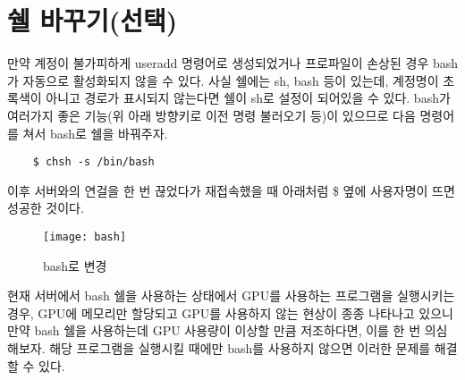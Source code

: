 \section{쉘 바꾸기(선택)}
만약 계정이 불가피하게 useradd 명령어로 생성되었거나 프로파일이 손상된 경우 bash가 자동으로 활성화되지 않을 수 있다. 사실 쉘에는 sh, bash 등이 있는데, 계정명이 초록색이 아니고 경로가 표시되지 않는다면 쉘이 sh로 설정이 되어있을 수 있다. bash가 여러가지 좋은 기능(위 아래 방향키로 이전 명령 불러오기 등)이 있으므로 다음 명령어를 쳐서 bash로 쉘을 바꿔주자.
\begin{lstlisting}
    $ chsh -s /bin/bash
\end{lstlisting}
이후 서버와의 연걸을 한 번 끊었다가 재접속했을 때 아래처럼 \$ 옆에 사용자명이 뜨면 성공한 것이다.
\begin{figure}[H]
	\begin{center}
        \texttt{[image: bash]}
        \caption{bash로 변경}
    \end{center}
\end{figure}
현재 서버에서 bash 쉘을 사용하는 상태에서 GPU를 사용하는 프로그램을 실행시키는 경우, GPU에 메모리만 할당되고 GPU를 사용하지 않는 현상이 종종 나타나고 있으니 만약 bash 쉘을 사용하는데 GPU 사용량이 이상할 만큼 저조하다면, 이를 한 번 의심해보자. 해당 프로그램을 실행시킬 때에만 bash를 사용하지 않으면 이러한 문제를 해결할 수 있다.
